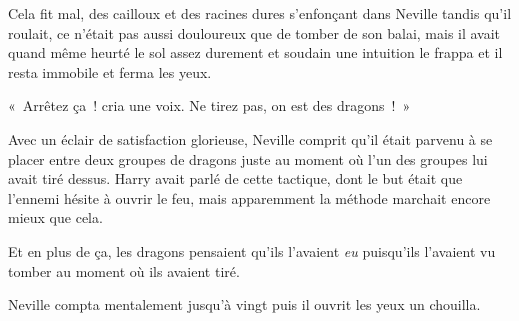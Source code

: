 Cela fit mal, des cailloux et des racines dures s'enfonçant dans Neville tandis qu'il roulait, ce n'était pas aussi douloureux que de tomber de son balai, mais il avait quand même heurté le sol assez durement et soudain une intuition le frappa et il resta immobile et ferma les yeux.

«~Arrêtez ça~! cria une voix.
Ne tirez pas, on est des dragons~!~»

Avec un éclair de satisfaction glorieuse, Neville comprit qu'il était parvenu à se placer entre deux groupes de dragons juste au moment où l'un des groupes lui avait tiré dessus.
Harry avait parlé de cette tactique, dont le but était que l'ennemi hésite à ouvrir le feu, mais apparemment la méthode marchait encore mieux que cela.

Et en plus de ça, les dragons pensaient qu'ils l'avaient \emph{eu} puisqu'ils l'avaient vu tomber au moment où ils avaient tiré.

Neville compta mentalement jusqu'à vingt puis il ouvrit les yeux un chouilla.

